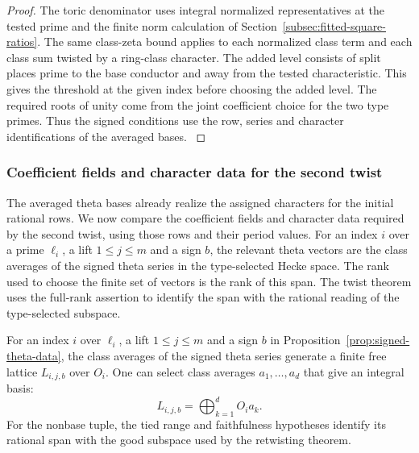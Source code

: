 \begin{proof}
The toric denominator uses
integral normalized representatives at the tested prime and
the finite norm calculation of
Section~\ref{subsec:fitted-square-ratios}. The same class-zeta
bound applies to each normalized class term and each class
sum twisted by a ring-class character. The added level consists
of split places prime to the base conductor and away from the
tested characteristic. This gives the threshold at the
given index before choosing the added level. The required roots of unity
come from the joint coefficient choice for the two type
primes. Thus the signed conditions use the row, series and
character identifications of the averaged bases.
\label{cor:automorphic-realization-53}
\end{proof}

\subsubsection*{Coefficient fields and character data for the second twist}

The averaged theta bases already realize the assigned characters for the initial rational rows. We now compare the coefficient fields and character data required by the second twist, using those rows and their period values.
For an index \(i\) over a prime \(\ell_i\), a lift
\(1\le j\le m\) and a sign \(b\), the relevant theta vectors
are the class averages of the signed theta series in the
type-selected Hecke space. The rank used to choose the finite
set of vectors is the rank of this span. The twist theorem uses
the full-rank assertion to identify the span with the rational
reading of the type-selected subspace.

\begin{proposition}\label{prop:retwisting-row-basis}
For an index \(i\) over \(\ell_i\), a lift \(1\le j\le m\) and
a sign \(b\) in Proposition~\ref{prop:signed-theta-data}, the class averages
of the signed theta series generate a finite free lattice
\(L_{i,j,b}\) over \(O_i\). One can select class averages \(a_1,\ldots,a_d\) that give an integral basis:
\[
 L_{i,j,b}=\bigoplus_{k=1}^{d} O_i a_k.
\] For the nonbase tuple, the tied
range and faithfulness hypotheses identify its rational
span with the good subspace used by the retwisting theorem.
\end{proposition}

